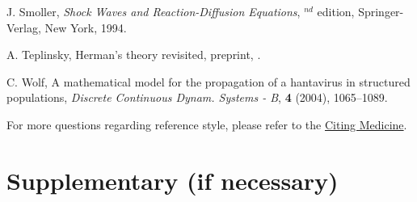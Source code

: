 \documentclass{mbe}
\numberwithin{equation}{section}
\begin{document}
\begin{thebibliography}{99}
     \newblock J.  Smoller,
     \newblock \emph{Shock Waves and Reaction-Diffusion Equations},
     $^{nd}$ edition,  Springer-Verlag, New York, 1994.

\newblock A. Teplinsky,
\newblock Herman's theory revisited, preprint,
\newblock {}.

     \newblock C.  Wolf,
     \newblock A mathematical model for the propagation of a hantavirus in structured populations,
     \newblock \emph{Discrete Continuous Dynam. Systems - B}, \textbf{4} (2004), 1065--1089.

\end{thebibliography}

For more questions regarding reference style, please refer to the \href{http://www.ncbi.nlm.nih.gov/books/NBK7256/}{Citing Medicine}.

\section*{Supplementary (if necessary)}
\end{document}
